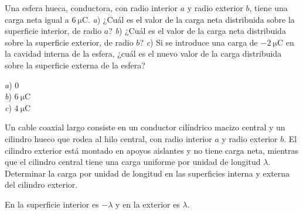 %
\begin{Exercise}
	Una esfera hueca, conductora, con radio interior $a$ y radio exterior $b$, tiene una carga neta igual a $\SI{6}{\micro\coulomb}$. \textit{a}) ¿Cuál es el valor de la carga neta distribuida sobre la superficie interior, de radio $a$? \textit{b}) ¿Cuál es el valor de la carga neta distribuida sobre la superficie exterior, de radio $b$? \textit{c}) Si se introduce una carga de $\SI{-2}{\micro\coulomb}$ en la cavidad interna de la esfera, ¿cuál es el nuevo valor de la carga distribuida sobre la superficie externa de la esfera?
\end{Exercise}
\begin{Answer}
	\begin{minipage}[t]{.4\textwidth}
		\textit{a}) 0\\ \textit{b}) $\SI{6}{\micro\coulomb}$\\ \textit{c}) $\SI{4}{\micro\coulomb}$
	\end{minipage}
\end{Answer}
%
\begin{Exercise}
	Un cable coaxial largo consiste en un conductor cilíndrico macizo central y un cilindro hueco que rodea al hilo central, con radio interior $a$ y radio exterior $b$. El cilindro exterior está montado en apoyos aislantes y no tiene carga neta, mientras que el cilindro central tiene una carga uniforme por unidad de longitud $\lambda$. Determinar la carga por unidad de longitud en las superficies interna y externa del cilindro exterior.
\end{Exercise}
\begin{Answer}
	\begin{minipage}[t]{.4\textwidth}
		En la superficie interior es $-\lambda$ y en la exterior es $\lambda$.
	\end{minipage}
\end{Answer}
%